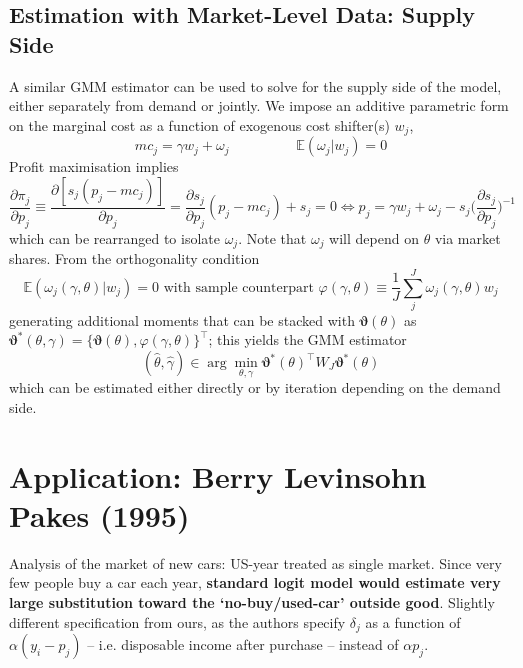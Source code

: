 \documentclass[11pt]{article}
\begin{document}
\subsection{Estimation with Market-Level Data: Supply Side}

A similar GMM estimator can be used to solve for the supply side of the model, either separately from demand or jointly.
We impose an additive parametric form on the marginal cost as a function of exogenous cost shifter(s) $w_j$,
\begin{equation}
	mc_j = \gamma w_j + \omega_j \hspace{2cm} \mathbb{E}(\omega_j | w_j) = 0
\end{equation}
Profit maximisation implies
\begin{equation}
	\frac{\partial \pi_j}{\partial p_j} \equiv \frac{\partial[s_j(p_j - mc_j)]}{\partial p_j} = \frac{\partial s_j}{\partial p_j}(p_j - mc_j) + s_j = 0 \Leftrightarrow p_j = \gamma w_j + \omega_j - s_j\big(\frac{\partial s_j}{\partial p_j}\big)^{-1}
\end{equation}
which can be rearranged to isolate $\omega_j$.
Note that $\omega_j$ will depend on $\theta$ via market shares.
From the orthogonality condition
\begin{equation}
	\mathbb{E}(\omega_j(\gamma, \theta) | w_j) = 0 \text{ with sample counterpart } \varphi(\gamma, \theta) \equiv  \frac{1}{J}\sum_j^J\omega_j(\gamma, \theta) w_j
\end{equation}
generating additional moments that can be stacked with $\bm{\vartheta}(\theta)$ as $\bm{\vartheta}^*(\theta, \gamma) = \{\bm{\vartheta}(\theta), \varphi(\gamma, \theta)\}^\intercal$; this yields the GMM estimator
\begin{equation}
		(\hat{\theta}, \hat{\gamma}) \in \arg \min_{\theta, \gamma} \bm{\vartheta}^*(\theta)^\intercal W_J \bm{\vartheta}^*(\theta)
\end{equation}
which can be estimated either directly or by iteration depending on the demand side.

\section{Application: Berry Levinsohn Pakes (1995)}

Analysis of the market of new cars: US-year treated as single market. Since very few people buy a car each year, \textbf{standard logit model would estimate very large substitution toward the `no-buy/used-car' outside good}. Slightly different specification from ours, as the authors specify $\delta_j$ as a function of $\alpha(y_i - p_j)$ -- i.e. disposable income after purchase -- instead of $\alpha p_j$. \\
\end{document}
